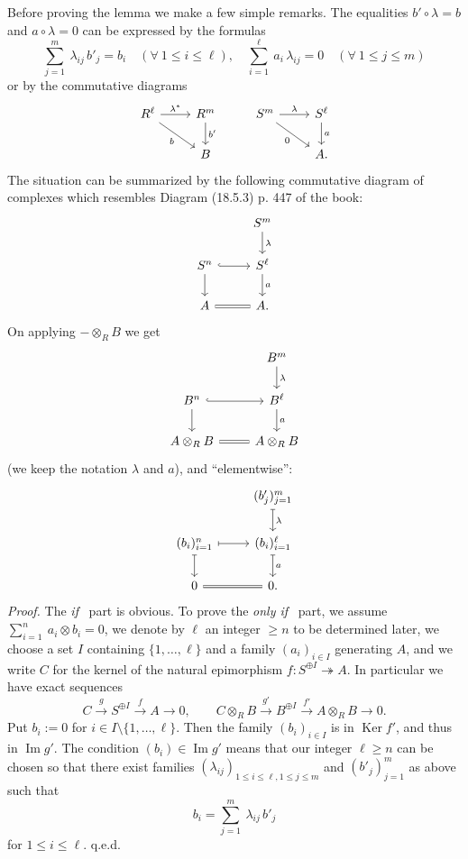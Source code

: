 \documentclass[12pt]{article}
\theoremstyle{remark}
\theoremstyle{definition}
\newcommand{\epi}{\twoheadrightarrow}
\newcommand{\xr}{\xrightarrow}
\DeclareMathOperator{\Ima}{Im}
\DeclareMathOperator{\Ker}{Ker}
\begin{document}
Before proving the lemma we make a few simple remarks. The equalities $b'\circ\lambda=b$ and $a\circ\lambda=0$ can be expressed by the formulas
$$
\sum_{j=1}^m\ \lambda_{ij}\,b'_j=b_i\quad(\forall\ 1\le i\le\ell),\quad
\sum_{i=1}^\ell\ a_i\,\lambda_{ij}=0\quad(\forall\ 1\le j\le m)
$$
or by the commutative diagrams
$$
\begin{tikzcd}
R^\ell\ar{r}{\lambda^*}\ar{rd}[swap]{b}&R^m\ar{d}{b'}&
S^m\ar{r}{\lambda}\ar{rd}[swap]{0}&S^\ell\ar{d}{a}
\\ 
{}&B&{}&A.
\end{tikzcd}
$$ 
The situation can be summarized by the following commutative diagram of complexes which resembles Diagram (18.5.3) p. 447 of the book:
$$
\begin{tikzcd}
{}&S^m\ar{d}{\lambda}\\ 
S^n\ar[hook]{r}\ar{d}&S^\ell\ar{d}{a}\\ 
A\ar[equal]{r}&A.
\end{tikzcd}
$$ 
On applying $-\otimes_RB$ we get 
$$
\begin{tikzcd}
{}&B^m\ar{d}{\lambda}\\ 
B^n\ar[hook]{r}\ar{d}&B^\ell\ar{d}{a}\\ 
A\otimes_RB\ar[equal]{r}&A\otimes_RB
\end{tikzcd}
$$ 
(we keep the notation $\lambda$ and $a$), and ``elementwise'':
\begin{equation}\label{eltwise}
\begin{tikzcd}
{}&(b'_j)_{j=1}^m\ar[mapsto]{d}{\lambda}\\ 
(b_i)_{i=1}^n\ar[mapsto]{r}\ar[mapsto]{d}&(b_i)_{i=1}^\ell\ar[mapsto]{d}{a}\\ 
0\ar[equal]{r}&0.
\end{tikzcd}
\end{equation}
{\em Proof.} The {\em if} \ part is obvious. To prove the {\em only if} \ part, we assume $\sum_{i=1}^n\ a_i\otimes b_i=0$, we denote by $\ell$ an integer $\ge n$ to be determined later, we choose a set $I$ containing $\{1,\dots,\ell\}$ and a family $(a_i)_{i\in I}$ generating $A$, and we write $C$ for the kernel of the natural epimorphism $f:S^{\oplus I}\epi A$. In particular we have exact sequences 
$$
C\xr gS^{\oplus I}\xr fA\to0,\qquad C\otimes_RB\xr{g'}B^{\oplus I}\xr{f'}A\otimes_RB\to0.
$$ 
Put $b_i:=0$ for $i\in I\setminus\{1,\dots,\ell\}$. Then the family $(b_i)_{i\in I}$ is in $\Ker f'$, and thus in $\Ima g'$. The condition $(b_i)\in\Ima g'$ means that our integer $\ell\ge n$ can be chosen so that there exist families $(\lambda_{ij})_{1\le i\le\ell,1\le j\le m}$ and $(b'_j)_{j=1}^m$ as above such that 
$$
b_i=\sum_{j=1}^m\ \lambda_{ij}\,b'_j
$$ 
for $1\le i\le\ell$. q.e.d.
\end{document}
